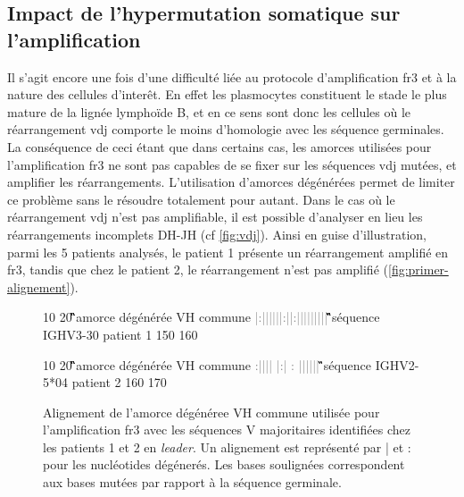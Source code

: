 \subsection{Impact de l'hypermutation somatique sur l'amplification}

Il s'agit encore une fois d'une difficulté liée au protocole d'amplification
\gls{fr}3 et à la nature des cellules d'interêt. En effet les plasmocytes
constituent le stade le plus mature de la lignée lymphoïde B, et en ce sens
sont donc les cellules où le réarrangement \gls{vdj} comporte le moins
d'homologie avec les séquence germinales. La conséquence de ceci étant que dans
certains cas, les amorces utilisées pour l'amplification \gls{fr}3 ne sont pas
capables de se fixer sur les séquences \gls{vdj} mutées, et amplifier les
réarrangements. L'utilisation d'amorces dégénérées permet de limiter ce
problème sans le résoudre totalement pour autant. Dans le cas où le
réarrangement \gls{vdj} n'est pas amplifiable, il est possible d'analyser en
lieu les réarrangements incomplets DH-JH (cf \autoref{fig:vdj}). Ainsi en guise
d'illustration, parmi les 5 patients analysés, le patient 1 présente un
réarrangement amplifié en \gls{fr}3, tandis que chez le patient 2, le
réarrangement n'est pas amplifié (\autoref{fig:primer-alignement}).

\begin{figure}[H]
    \centering
    \begin{ColoredVerbatim}
        10         20
        \G\Hbase\G\G\A\C\A\C\N\G\C\Y\G\T\G\T\A\T\T\A\C amorce dégénérée VH commune
        \textcolor{gray}{|:||||||:||:|||||||||}
        \G\A\G\G\A\C\A\C\G\G\C\T\G\T\G\T\A\T\T\A\C séquence IGHV3-30 patient 1
        150       160

        10 20 \G\Hbase\G\G\A\C\A\C\N\G\C\Y\G\T\G\T\A\T\T\A\C amorce dégénérée
        VH commune \textcolor{gray}{ :|||| |:| : ||||||}
        \A\T\G\G\A\C\Tb\C\A\G\G\C\A\C\Tb\T\A\T\T\A\C séquence IGHV2-5*04
        patient 2 160 170
    \end{ColoredVerbatim}
    \caption{
        Alignement de l'amorce dégénéree VH commune utilisée pour l'amplification \gls{fr}3
        avec les séquences V majoritaires identifiées chez les patients 1 et 2 en \textit{leader}.
        Un alignement est représenté par | et : pour les nucléotides dégénerés. Les bases soulignées
        correspondent aux bases mutées par rapport à la séquence germinale.
    }
    \label{fig:primer-alignement}
\end{figure}


